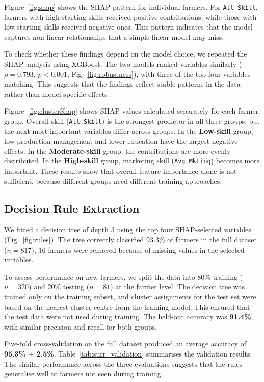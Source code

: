 \documentclass[fleqn,10pt,lineno]{wlpeerj}
\begin{document}
Figure~\ref{fig:shap} shows the SHAP pattern for individual farmers. For \texttt{All\_Skill}, farmers with high starting skills received positive contributions, while those with low starting skills received negative ones. This pattern indicates that the model captures non-linear relationships that a simple linear model may miss.

To check whether these findings depend on the model choice, we repeated the SHAP analysis using XGBoost. The two models ranked variables similarly ($\rho = 0.793$, $p < 0.001$; Fig.~\ref{fig:robustness}), with three of the top four variables matching. This suggests that the findings reflect stable patterns in the data rather than model-specific effects \citep{lundberg2020}.

Figure~\ref{fig:clusterShap} shows SHAP values calculated separately for each farmer group. Overall skill (\texttt{All\_Skill}) is the strongest predictor in all three groups, but the next most important variables differ across groups. In the \textbf{Low-skill} group, low production management and lower education have the largest negative effects. In the \textbf{Moderate-skill} group, the contributions are more evenly distributed. In the \textbf{High-skill} group, marketing skill (\texttt{Avg\_Mkting}) becomes more important. These results show that overall feature importance alone is not sufficient, because different groups need different training approaches.

\subsection{Decision Rule Extraction}
We fitted a decision tree of depth 3 using the top four SHAP-selected variables (Fig.~\ref{fig:rules}). The tree correctly classified 93.3\% of farmers in the full dataset ($n = 817$); 16 farmers were removed because of missing values in the selected variables.

To assess performance on new farmers, we split the data into 80\% training ($n = 320$) and 20\% testing ($n = 81$) at the farmer level. The decision tree was trained only on the training subset, and cluster assignments for the test set were based on the nearest cluster centre from the training model. This ensured that the test data were not used during training. The held-out accuracy was \textbf{91.4\%}, with similar precision and recall for both groups.

Five-fold cross-validation on the full dataset produced an average accuracy of \textbf{95.3\% $\pm$ 2.5\%}. Table~\ref{tab:surr_validation} summarises the validation results. The similar performance across the three evaluations suggests that the rules generalise well to farmers not seen during training.
\end{document}
